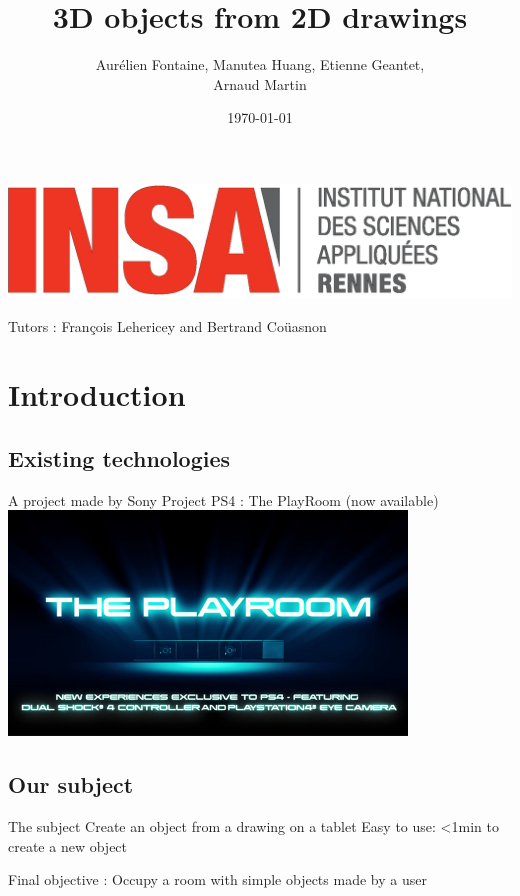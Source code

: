 \documentclass[a4paper,10pt]{beamer}
\title{3D objects from 2D drawings}
\author[Groupe 3INFO]{Aurélien Fontaine, Manutea Huang, Etienne Geantet,\\ Arnaud Martin}
\institute[INSA de Rennes]{Institut National des Sciences Appliquées de Rennes}
\date{\today}
\begin{document}
	\begin{frame}
		\begin{titlepage}
			\centerline{\includegraphics[scale=0.1]{images/logos/logoINSA.jpg}}
			\centerline{Tutors : François Lehericey and Bertrand Coüasnon}	
		\end{titlepage}
	\end{frame}
	
	
	
	\section{Introduction}
		\subsection{Existing technologies}
		
		\begin{frame}{A project made by Sony}
			Project PS4 : The PlayRoom (now available)
			\href{run:The_PlayRoom.avi}{\includegraphics[width=300pt]{images/The-Playroom.jpg}}
		\end{frame}
		
			
	\begin{frame}
		\tableofcontents
	\end{frame}
			
		\subsection{Our subject}
		
		\begin{frame}{The subject}	
			Create an object from a drawing on a tablet
			Easy to use: <1min to create a new object
			
			Final objective : Occupy a room with simple objects made by a user
		\end{frame}
		
\end{document}
